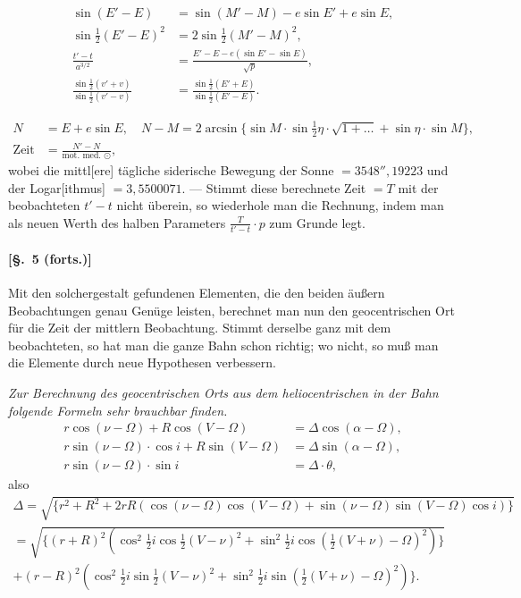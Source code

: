 \documentclass[12pt,a4paper]{article}
\theoremstyle{plain}
\theoremstyle{definition}
\theoremstyle{remark}
\begin{document}
\begin{align*}
\sin(E' - E) &= \sin(M' - M) - e \sin E' + e \sin E, \\
\sin\tfrac{1}{2}(E' - E)^2 &= 2 \sin\tfrac{1}{2}(M' - M)^2, \\
\frac{t' - t}{a^{3/2}} &= \frac{E' - E - e(\sin E' - \sin E)}{\sqrt{p}}, \\
\frac{\sin\tfrac{1}{2}(v' + v)}{\sin\tfrac{1}{2}(v' - v)} &= \frac{\sin\tfrac{1}{2}(E' + E)}{\sin\tfrac{1}{2}(E' - E)}.
\end{align*}

\begin{align*}
N &= E + e \sin E, \quad N - M = 2 \arcsin\{\sin M \cdot \sin\tfrac{1}{2}\eta \cdot \sqrt{1 + \dots} + \sin\eta \cdot \sin M\}, \\
\text{Zeit} &= \frac{N' - N}{\text{mot. med. } \odot},
\end{align*}
wobei die mittl[ere] tägliche siderische Bewegung der Sonne $= 3548''{,}19223$ und der Logar[ithmus] $= 3{,}5500071$. --- Stimmt diese berechnete Zeit $= T$ mit der beobachteten $t' - t$ nicht überein, so wiederhole man die Rechnung, indem man als neuen Werth des halben Parameters $\frac{T}{t' - t} \cdot p$ zum Grunde legt.

\newpage

\paragraph{[§.~5 (forts.)]}

Mit den solchergestalt gefundenen Elementen, die den beiden äußern Beobachtungen genau Genüge leisten, berechnet man nun den geocentrischen Ort für die Zeit der mittlern Beobachtung. Stimmt derselbe ganz mit dem beobachteten, so hat man die ganze Bahn schon richtig; wo nicht, so muß man die Elemente durch neue Hypothesen verbessern.

\medskip

\textit{Zur Berechnung des geocentrischen Orts aus dem heliocentrischen in der Bahn folgende Formeln sehr brauchbar finden.}
\begin{align*}
r \cos(\nu - \Omega) + R \cos(V - \Omega) &= \Delta \cos(\alpha - \Omega), \\
r \sin(\nu - \Omega) \cdot \cos i + R \sin(V - \Omega) &= \Delta \sin(\alpha - \Omega), \\
r \sin(\nu - \Omega) \cdot \sin i &= \Delta \cdot \theta,
\end{align*}
also
\begin{multline*}
\Delta = \sqrt{\{r^2 + R^2 + 2rR(\cos(\nu - \Omega) \cos(V - \Omega) + \sin(\nu - \Omega) \sin(V - \Omega) \cos i)\}} \\
= \sqrt{\{(r + R)^2(\cos^2\tfrac{1}{2}i \cos\tfrac{1}{2}(V - \nu)^2 + \sin^2\tfrac{1}{2}i \cos(\tfrac{1}{2}(V + \nu) - \Omega)^2)\}} \\
+ (r - R)^2(\cos^2\tfrac{1}{2}i \sin\tfrac{1}{2}(V - \nu)^2 + \sin^2\tfrac{1}{2}i \sin(\tfrac{1}{2}(V + \nu) - \Omega)^2)\}.
\end{multline*}
\end{document}
